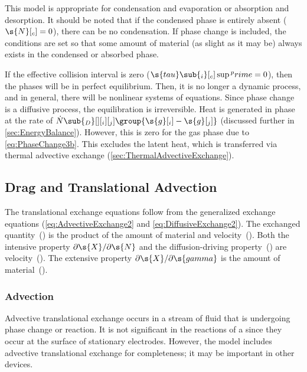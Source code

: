 This model is appropriate for condensation and evaporation or absorption and desorption.  It should be noted that if the condensed phase is entirely absent ($\s{N}[_c] = 0$), there can be no condensation.  If phase change is included, the conditions are set so that some amount of material (as slight as it may be) always exists in the condensed or absorbed phase.

If the effective collision interval is zero ($\s{tau}\sub{_i}[_c]\sup{^prime} = 0$), then the phases will be in perfect equilibrium.  Then, it is no longer a dynamic process, and in general, there will be nonlinear systems of equations.  Since phase change is a diffusive process, the equilibration is irreversible.  Heat is generated in phase~ at the rate of $\dot{N}\sub{_D}[ ][_i][_j]\group{\s{g}[_i] - \s{g}[_j]}$ (discussed further in \autoref{sec:EnergyBalance}).  However,  this is zero for the gas phase due to \autoref{eq:PhaseChange3b}.  This excludes the latent heat, which is transferred via thermal advective exchange (\autoref{sec:ThermalAdvectiveExchange}).


\subsection{Drag and Translational Advection}
\label{sec:TranslationalExchange}

The translational exchange equations follow from the generalized exchange equations (\ref{eq:AdvectiveExchange2} and \ref{eq:DiffusiveExchange2}).  The exchanged quantity~() is the product of the amount of material and velocity~().  Both the intensive property $\partial\s{X}/\partial\s{N}$ %
and the diffusion-driving property~() are velocity~().  The extensive property $\partial\s{X}/\partial\s{gamma}$ %
is the amount of material~().


\subsubsection{Advection}


Advective translational exchange occurs in a stream of fluid that is undergoing phase change or reaction.  It is not significant in the reactions of a  since they occur at the surface of stationary electrodes.  However, the model includes advective translational exchange for completeness; it may be important in other devices.


